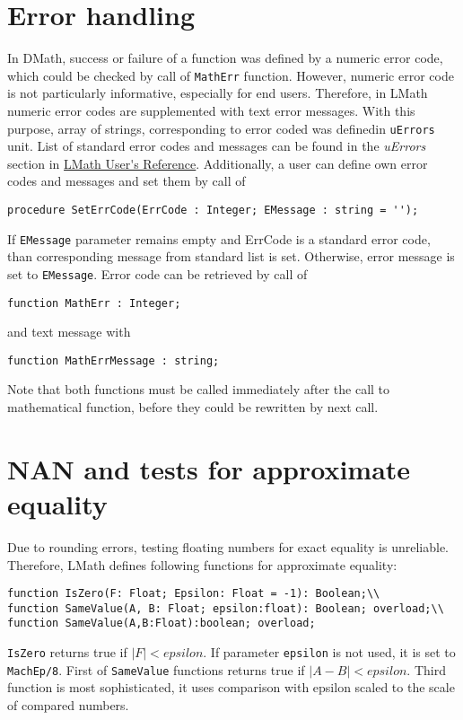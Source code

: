 \documentclass[12pt,a4paper,oneside]{report}
\newcommand{\code}[1]{\texttt{#1}}
\begin{document}
\section{Error handling}
In DMath, success or failure of a function was defined by a numeric error code, which could be checked by call of \code{MathErr} function.
However, numeric error code is not particularly informative, especially for end users. Therefore, in LMath numeric error codes are supplemented with text error messages. With this purpose, array of strings, corresponding to error coded was definedin \code{uErrors} unit. List of standard error codes and messages can be found in the \textit{uErrors} section in \hyperref{file:LMath05.pdf}{}{}{LMath User\'{}s Reference}. Additionally, a user can define own error codes and messages and set them by call of
\begin{lstlisting}
procedure SetErrCode(ErrCode : Integer; EMessage : string = '');
\end{lstlisting}
If \code{EMessage} parameter remains empty and ErrCode is a standard error code, than corresponding message from standard list is set. Otherwise, error message is set to \code{EMessage}. Error code can be retrieved by call of
\begin{lstlisting}
function MathErr : Integer;
\end{lstlisting}
and text message with
\begin{lstlisting}
function MathErrMessage : string;
\end{lstlisting}
Note that both functions must be called immediately after the call to mathematical function, before they could be rewritten by next call.
\section{NAN and tests for approximate equality}
Due to rounding errors, testing floating numbers for exact equality is unreliable. Therefore, LMath defines following functions for approximate equality:
\begin{lstlisting}
function IsZero(F: Float; Epsilon: Float = -1): Boolean;\\
function SameValue(A, B: Float; epsilon:float): Boolean; overload;\\
function SameValue(A,B:Float):boolean; overload;
\end{lstlisting}
\code{IsZero} returns true if $\left| F \right| < epsilon$. If parameter \code{epsilon} is not used, it is set to \code{MachEp/8}. First of \code{SameValue} functions returns true if $\left| A - B \right| < epsilon$. Third function is most sophisticated, it uses comparison with epsilon scaled to the scale of compared numbers. 
\end{document}
